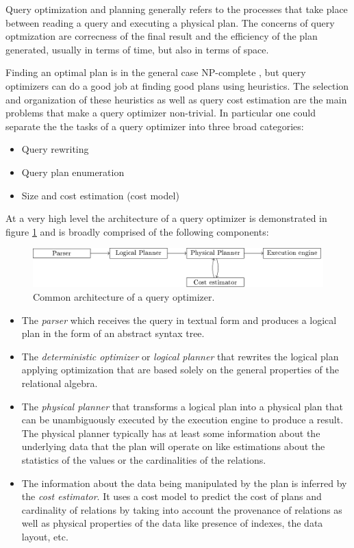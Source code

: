 Query optimization and planning generally refers to the processes that
take place between reading a query and executing a physical plan. The
concerns of query optmization are correcness of the final result and
the efficiency of the plan generated, usually in terms of time, but
also in terms of space.

Finding an optimal plan is in the general case NP-complete
\cite{ullmanInformationIntegrationUsing1997}, but query optimizers can
do a good job at finding good plans using heuristics. The selection
and organization of these heuristics as well as query cost estimation
are the main problems that make a query optimizer non-trivial. In
particular one could separate the the tasks of a query optimizer
into three broad categories:

\begin{itemize}
\item Query rewriting
\item Query plan enumeration
\item Size and cost estimation (cost model)
\end{itemize}


At a very high level the architecture of a query optimizer is
demonstrated in figure \ref{fig:optimizer_arch} and is broadly
comprised of the following components:

\begin{figure}[p]
\centering
\includegraphics[width=\textwidth]{./imgs/optimizer_architecture.pdf}
\caption{\label{fig:optimizer_arch}Common architecture of a query
  optimizer.}
\end{figure}

\begin{itemize}

\item The \emph{parser} which receives the query in textual form and
  produces a logical plan in the form of an abstract syntax tree.
\item The \emph{deterministic optimizer} or \emph{logical planner}
  that rewrites the logical plan applying optimization that are based
  solely on the general properties of the relational algebra.
\item The \emph{physical planner} that transforms a logical plan into
  a physical plan that can be unambiguously executed by the execution
  engine to produce a result. The physical planner typically has at
  least some information about the underlying data that the plan will
  operate on like estimations about the statistics of the values or
  the cardinalities of the relations.
\item The information about the data being manipulated by the plan is
  inferred by the \emph{cost estimator}. It uses a cost model to
  predict the cost of plans and cardinality of relations by taking
  into account the provenance of relations as well as physical
  properties of the data like presence of indexes, the data layout,
  etc.
\end{itemize}

